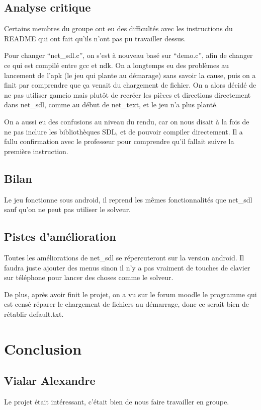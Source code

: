 \documentclass[12pt]{article}
\begin{document}
\subsection{Analyse critique}
Certains membres du groupe ont eu des difficultés avec les instructions du README qui ont fait qu'ils n'ont pas pu travailler dessus.

Pour changer ``net\_sdl.c'', on s'est à nouveau basé sur ``demo.c'', afin de changer ce qui est compilé entre gcc et ndk. On a longtemps eu des problèmes au lancement de l'apk (le jeu qui plante au démarage) sans savoir la cause, puis on a finit par comprendre que ça venait du chargement de fichier. On a alors décidé de ne pas utiliser gameio mais plutôt de recréer les pièces et directions directement dans net\_sdl, comme au début de net\_text, et le jeu n'a plus planté.

On a aussi eu des confusions au niveau du rendu, car on nous disait à la fois de ne pas inclure les bibliothèques SDL, et de pouvoir compiler directement. Il a fallu confirmation avec le professeur pour comprendre qu'il fallait suivre la première instruction.
\subsection{Bilan}
Le jeu fonctionne sous android, il reprend les mêmes fonctionnalités que net\_sdl sauf qu'on ne peut pas utiliser le solveur.
\subsection{Pistes d'amélioration}
Toutes les améliorations de net\_sdl se répercuteront sur la version android. Il faudra juste ajouter des menus sinon il n'y a pas vraiment de touches de clavier sur téléphone pour lancer des choses comme le solveur.

De plus, après avoir finit le projet, on a vu sur le forum moodle le programme qui est censé réparer le chargement de fichiers au démarrage, donc ce serait bien de rétablir default.txt.



\section{Conclusion}
\subsection{Vialar Alexandre}
Le projet était intéressant, c'était bien de nous faire travailler en groupe.
\end{document}
